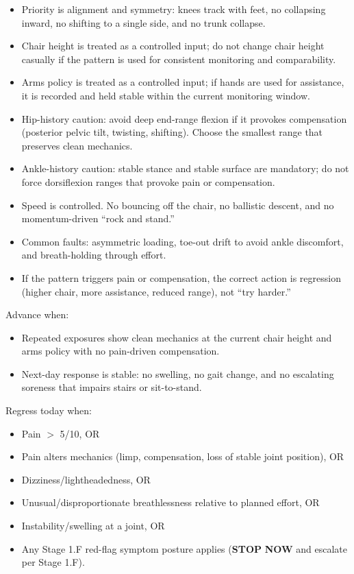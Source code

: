 \documentclass[10pt]{article}
\begin{document}
\begin{itemize}
\item Priority is alignment and symmetry: knees track with feet, no collapsing inward, no shifting to a single side, and no trunk collapse.
\item Chair height is treated as a controlled input; do not change chair height casually if the pattern is used for consistent monitoring and comparability.
\item Arms policy is treated as a controlled input; if hands are used for assistance, it is recorded and held stable within the current monitoring window.
\item Hip-history caution: avoid deep end-range flexion if it provokes compensation (posterior pelvic tilt, twisting, shifting). Choose the smallest range that preserves clean mechanics.
\item Ankle-history caution: stable stance and stable surface are mandatory; do not force dorsiflexion ranges that provoke pain or compensation.
\item Speed is controlled. No bouncing off the chair, no ballistic descent, and no momentum-driven “rock and stand.”
\item Common faults: asymmetric loading, toe-out drift to avoid ankle discomfort, and breath-holding through effort.
\item If the pattern triggers pain or compensation, the correct action is regression (higher chair, more assistance, reduced range), not “try harder.”
\end{itemize}

Advance when:

\begin{itemize}
\item Repeated exposures show clean mechanics at the current chair height and arms policy with no pain-driven compensation.
\item Next-day response is stable: no swelling, no gait change, and no escalating soreness that impairs stairs or sit-to-stand.
\end{itemize}

Regress today when:

\begin{itemize}
\item Pain $>$ 5/10, OR
\item Pain alters mechanics (limp, compensation, loss of stable joint position), OR
\item Dizziness/lightheadedness, OR
\item Unusual/disproportionate breathlessness relative to planned effort, OR
\item Instability/swelling at a joint, OR
\item Any Stage 1.F red-flag symptom posture applies (\textbf{STOP} \textbf{NOW} and escalate per Stage 1.F).
\end{itemize}
\end{document}

